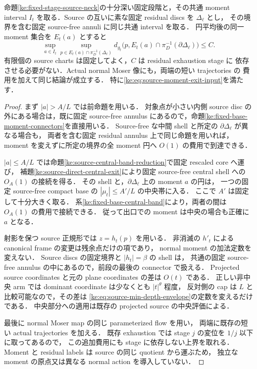 \begin{theorem}
\label{ke:source-all-moment-exit}
命題\ref{ke:fixed-stage-source-neck}の十分深い固定段階と，その共通 moment interval
$I_t$ を取る．Source の互いに素な固定 residual discs を $\Delta_\ell$ とし，
その境界を含む固定 source-free annuli に同じ共通 interval を取る．
円平均後の同一 moment 集合を $E_t(a)$ とすると
\begin{equation}\label{ke:eq:source-all-moment-exit}
 \sup_{a\in I_t}\sup_{p\in E_t(a)\cap\pi_D^{-1}(\Delta_\ell)}
 d_{g_t}\bigl(p,E_t(a)\cap\pi_D^{-1}(\partial\Delta_\ell)\bigr)
 \le C.
\end{equation}
有限個の source charts は固定してよく，$C$ は residual exhaustion stage に
依存させる必要がない．Actual normal Moser 像にも，両端の短い trajectories の
費用を加えて同じ結論が成立する．
特に\eqref{ke:eq:source-moment-exit-input}を満たす．
\end{theorem}

\begin{proof}
まず $|a|>A/L$ では前命題を用いる．
対象点が小さい内側 source disc の外にある場合は，既に固定 source-free annulus
にあるので，命題\ref{ke:fixed-base-moment-connectors}を直接用いる．
Source-free な中間 shell と所定の $\partial\Delta_\ell$ が異なる場合も，
両者を含む固定 residual annulus 上で同じ命題を用いれば，
moment を変えずに所定の境界の全 moment 円へ $O(1)$ の費用で到達できる．

$|a|\le A/L$ では命題\ref{ke:source-central-band-reduction}で固定 rescaled core へ運び，
補題\ref{ke:source-direct-central-exit}により固定 source-free central shell への
$O_A(1)$ の接続を得る．
その shell と，$\partial\Delta_\ell$ 上の moment $a$ の円は，
一つの固定 source-free compact base の $|\mu_t|\le A'/L$ の中央帯に入る．
ここで $A'$ は固定して十分大きく取る．
系\ref{ke:fixed-base-central-band}により，両者の間は $O_A(1)$ の費用で接続できる．
従って出口での moment は中央の場合も正確に $a$ となる．

射影を保つ source 正規形では $z=h_t(p)$ を用いる．
非消滅の $h'_t$ による canonical frame の変更は残余点だけの項であり，
normal moment の加法定数を変えない．
Source discs の固定境界と $|h_t|=\beta$ の shell は，
共通の固定 source-free annulus の中にあるので，前段の最後の connector で扱える．
Projected source coordinates と元の plane coordinates の差は $O(t)$ である．
正しい非中央 arm では dominant coordinate は少なくとも $|t|^\theta$ 程度，
反対側の cap は $L$ と比較可能なので，その差は
\eqref{ke:eq:source-min-depth-envelope}の定数を変えるだけである．
中央部分への適用は既存の projected source の中央評価による．

最後に normal Moser map の同じ parameterized flow を用い，
両端に既存の短い actual trajectories を加える．
既存 exhaustion では stage $j$ の変位を $1/j$ 以下に取ってあるので，
この追加費用にも stage に依存しない上界を取れる．
Moment と residual labels は source の同じ quotient から運ぶため，
独立な moment の原点又は異なる normal action を導入していない．
\end{proof}

